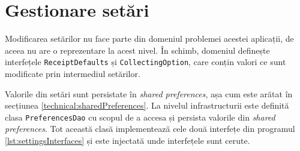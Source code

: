 \section{Gestionare setări}

Modificarea setărilor nu face parte din domeniul problemei acestei aplicații, de aceea nu are o reprezentare la acest nivel. În schimb, domeniul definește interfețele \texttt{ReceiptDefaults} și \texttt{CollectingOption}, care conțin valori ce sunt modificate prin intermediul setărilor.



Valorile din setări sunt persistate în \emph{shared preferences}, așa cum este arătat în secțiunea \ref{technical:sharedPreferences}. La nivelul infrastructurii este definită clasa \texttt{PreferencesDao} cu scopul de a accesa și persista valorile din \emph{shared preferences}. Tot această clasă implementează cele două interfețe din programul \ref{lst:settingsInterfaces} și este injectată unde interfețele sunt cerute.
